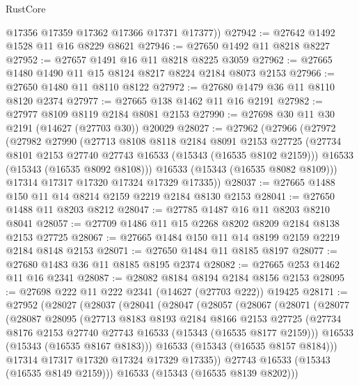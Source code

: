 \begin{lexlean}{RustCore}
\begin{coremodule}
        @17356
        @17359
        @17362
        @17366
        @17371
        @17377))
@27942 := @27642 @1492 @1528 @11 @16 @8229 @8621
@27946 := @27650 @1492 @11 @8218 @8227
@27952 := @27657 @1491 @16 @11 @8218 @8225 @3059
@27962 := @27665 @1480 @1490 @11 @15 @8124 @8217 @8224 @2184 @8073 @2153
@27966 := @27650 @1480 @11 @8110 @8122
@27972 := @27680 @1479 @36 @11 @8110 @8120 @2374
@27977 := @27665 @138 @1462 @11 @16 @2191
@27982 := @27977 @8109 @8119 @2184 @8081 @2153
@27990 := @27698 @30 @11 @30 @2191 (@14627 (@27703 @30)) @20029
@28027 := @27962
    (@27966
      (@27972
        (@27982
          @27990
          (@27713
            @8108
            @8118
            @2184
            @8091
            @2153
            @27725
            (@27734 @8101 @2153 @27740 @27743 @16533 (@15343 (@16535 @8102 @2159)))
            @16533
            (@15343 (@16535 @8092 @8108)))
          @16533
          (@15343 (@16535 @8082 @8109)))
        @17314
        @17317
        @17320
        @17324
        @17329
        @17335))
@28037 := @27665 @1488 @150 @11 @14 @8214 @2159 @2219 @2184 @8130 @2153
@28041 := @27650 @1488 @11 @8203 @8212
@28047 := @27785 @1487 @16 @11 @8203 @8210 @8041
@28057 := @27709 @1486 @11 @15 @2268 @8202 @8209 @2184 @8138 @2153 @27725
@28067 := @27665 @1484 @150 @11 @14 @8199 @2159 @2219 @2184 @8148 @2153
@28071 := @27650 @1484 @11 @8185 @8197
@28077 := @27680 @1483 @36 @11 @8185 @8195 @2374
@28082 := @27665 @253 @1462 @11 @16 @2341
@28087 := @28082 @8184 @8194 @2184 @8156 @2153
@28095 := @27698 @222 @11 @222 @2341 (@14627 (@27703 @222)) @19425
@28171 := @27952
    (@28027
      (@28037
        (@28041
          (@28047
            (@28057
              (@28067
                (@28071
                  (@28077
                    (@28087
                      @28095
                      (@27713
                        @8183
                        @8193
                        @2184
                        @8166
                        @2153
                        @27725
                        (@27734 @8176 @2153 @27740 @27743 @16533 (@15343 (@16535 @8177 @2159)))
                        @16533
                        (@15343 (@16535 @8167 @8183)))
                      @16533
                      (@15343 (@16535 @8157 @8184)))
                    @17314
                    @17317
                    @17320
                    @17324
                    @17329
                    @17335))
                @27743
                @16533
                (@15343 (@16535 @8149 @2159)))
              @16533
              (@15343 (@16535 @8139 @8202)))

\end{coremodule}
\end{lexlean}
